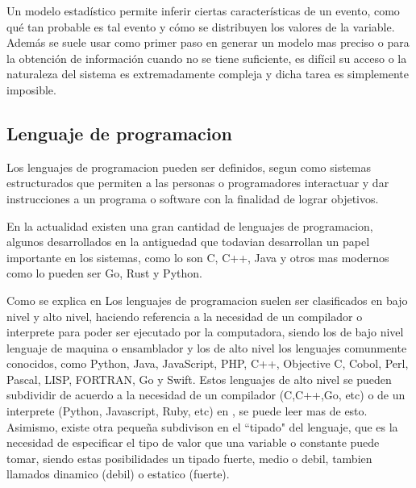 Un modelo estadístico permite inferir ciertas características de un evento,
como qué tan probable es tal evento y cómo se distribuyen los valores de la
variable. Además se suele usar como primer paso en generar un modelo mas
preciso o para la obtención de información cuando no se tiene suficiente,
es difícil su acceso o la naturaleza del
sistema es extremadamente compleja y dicha tarea es simplemente imposible.


\subsection{Lenguaje de programacion}
Los lenguajes de programacion pueden ser definidos, segun \cite{ETAC} como
sistemas estructurados
que permiten a las personas o programadores interactuar y dar instrucciones a un
programa o software con la finalidad de lograr objetivos.

En la actualidad existen una gran cantidad de lenguajes de programacion, algunos
desarrollados en la antiguedad que todavian desarrollan un papel importante en
los sistemas, como lo son C, C++, Java y otros mas modernos como lo pueden ser
Go, Rust y Python.

Como se explica en \cite{javaTpoint}
Los lenguajes de programacion suelen ser clasificados en bajo nivel y alto nivel,
haciendo referencia a la necesidad de un compilador o interprete para poder ser
ejecutado por la computadora, siendo los de bajo nivel lenguaje de maquina o
ensamblador y los de alto nivel los lenguajes comunmente conocidos, como
Python, Java, JavaScript, PHP, C++, Objective C, Cobol, Perl, Pascal, LISP,
FORTRAN, Go y Swift. Estos lenguajes de alto nivel se pueden subdividir
de acuerdo a la necesidad de un compilador (C,C++,Go, etc) o de un interprete
(Python, Javascript, Ruby, etc) en \cite{LenguajesCompiladosEInterpretados}, se
puede leer mas de esto. Asimismo, existe otra pequeña subdivison en el ``tipado"
del lenguaje, que es la necesidad de especificar el tipo de valor que una
variable o constante puede tomar, siendo estas posibilidades un tipado fuerte,
medio o debil, tambien llamados dinamico (debil) o estatico (fuerte).


